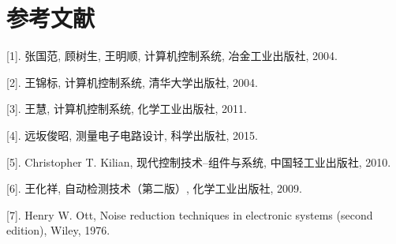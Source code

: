 \chapter*{参考文献}
\begin{flushleft}

[1]. 张国范, 顾树生, 王明顺, 计算机控制系统, 冶金工业出版社, 2004.

[2]. 王锦标, 计算机控制系统, 清华大学出版社, 2004.

[3]. 王慧, 计算机控制系统, 化学工业出版社, 2011.

[4]. 远坂俊昭, 测量电子电路设计, 科学出版社, 2015.

[5]. Christopher T. Kilian, 现代控制技术--组件与系统, 中国轻工业出版社, 2010.

[6]. 王化祥, 自动检测技术（第二版）, 化学工业出版社, 2009.

[7]. Henry W. Ott, Noise reduction techniques in electronic systems (second edition), Wiley, 1976.
\end{flushleft}


